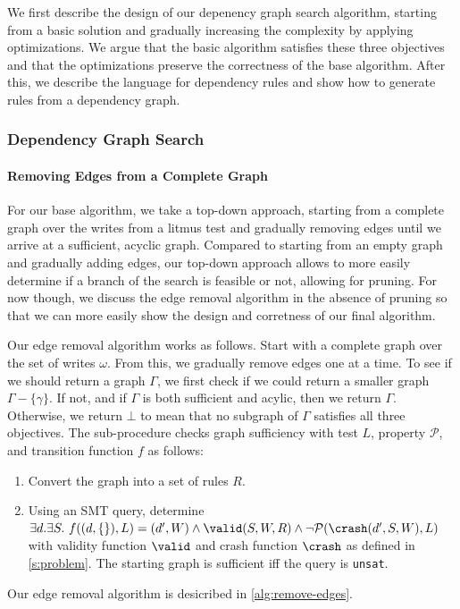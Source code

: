 We first describe the design of our depenency graph
search algorithm, starting from a basic solution and
gradually increasing the complexity by applying optimizations. We argue that
the basic algorithm satisfies these three objectives and that the optimizations
preserve the correctness of the base algorithm.
After this, we describe the language for dependency rules and show how to generate rules
from a dependency graph.

\subsubsection{Dependency Graph Search}
\paragraph{Removing Edges from a Complete Graph}
For our base algorithm, we take a top-down approach, starting from a complete graph
over the writes from a litmus test and gradually removing edges until we arrive
at a sufficient, acyclic graph. Compared to starting from an empty graph and
gradually adding edges, our top-down approach allows \depsynth to more easily
determine if a branch of the search is feasible or not, allowing for pruning.
For now though, we discuss the edge removal algorithm in the absence of pruning
so that we can more easily show the design and corretness of our final algorithm.

Our edge removal algorithm works as follows.
Start with a complete graph over the set of writes $\omega$. From this, we gradually remove
edges one at a time. To see if we should return a graph $\Gamma$, we first check
if we could return a smaller graph $\Gamma - \{\gamma\}$. If not, and if
$\Gamma$ is both sufficient and acylic, then we return $\Gamma$. Otherwise,
we return $\bot$ to mean that no subgraph of $\Gamma$ satisfies all three objectives.
The sub-procedure \graphsuff checks graph sufficiency with test $L$, property $\mathcal{P}$,
and transition function $f$ as follows:
\begin{enumerate}
  \item Convert the graph into a set of rules $R$.
  \item Using an SMT query, determine
    $\exists d.\exists S.\  
       f((d,\{\}), L) = (d', W)
       \wedge \valid(S,W,R)
       \wedge \neg\mathcal{P}(\crash(d',S,W), L)$
       with validity function $\valid$ and crash function $\crash$ as defined in \autoref{s:problem}.
       The starting graph is sufficient iff the query is \texttt{unsat}.
\end{enumerate}
Our edge removal algorithm is desicribed in \autoref{alg:remove-edges}.

